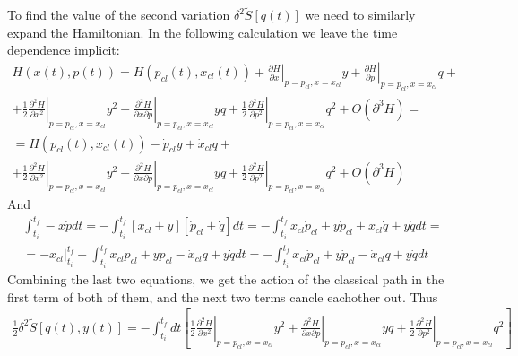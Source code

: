 \documentclass{article}
\begin{document}
To find the value of the second variation $\delta^2\tilde{S}[q(t)]$ we need to similarly expand the Hamiltonian. In the following calculation we leave the time dependence implicit:
\begin{equation}
\begin{gathered}
    H(x(t),p(t)) = H(p_{cl}(t), x_{cl}(t)) +
        \left.\frac{\partial H}{\partial x}\right|_{p=p_{cl}, x=x_{cl}}y + \left.\frac{\partial H}{\partial p}\right|_{p=p_{cl}, x=x_{cl}}q +
        \\
        +  \left.\frac{1}{2}\frac{\partial^2 H}{\partial x^2}\right|_{p=p_{cl}, x=x_{cl}}y^2
        +  \left.\frac{\partial^2 H}{\partial x\partial p}\right|_{p=p_{cl}, x=x_{cl}}yq
        +  \left.\frac{1}{2}\frac{\partial^2 H}{\partial p^2}\right|_{p=p_{cl}, x=x_{cl}}q^2 + O(\partial^3 H) = 
        \\
        = H(p_{cl}(t), x_{cl}(t)) -
        \dot{p}_{cl}y + \dot{x}_{cl}q +
        \\
        +  \left.\frac{1}{2}\frac{\partial^2 H}{\partial x^2}\right|_{p=p_{cl}, x=x_{cl}}y^2
        +  \left.\frac{\partial^2 H}{\partial x\partial p}\right|_{p=p_{cl}, x=x_{cl}}yq
        +  \left.\frac{1}{2}\frac{\partial^2 H}{\partial p^2}\right|_{p=p_{cl}, x=x_{cl}}q^2 + O(\partial^3 H)
\end{gathered}
\end{equation}
And
\begin{equation}
\begin{gathered}
    \int_{t_i}^{t_f} -x\dot{p} dt = -\int_{t_i}^{t_f} \left[x_{cl} + y\right]\left[\dot{p}_{cl} + \dot{q}\right] dt
    = -\int_{t_i}^{t_f} x_{cl}\dot{p}_{cl} + y\dot{p}_{cl} + x_{cl}\dot{q} + y\dot{q} dt =
    \\
    = -\left.x_{cl}\right|_{t_i}^{t_f}-\int_{t_i}^{t_f} x_{cl}\dot{p}_{cl} + y\dot{p}_{cl} - \dot{x}_{cl}q + y\dot{q} dt
    = -\int_{t_i}^{t_f} x_{cl}\dot{p}_{cl} + y\dot{p}_{cl} - \dot{x}_{cl}q + y\dot{q} dt
\end{gathered}
\end{equation}
Combining the last two equations, we get the action of the classical path in the first term of both of them, and the next two terms cancle eachother out. Thus
\begin{equation}
\begin{gathered}
    \frac{1}{2}\delta^2\tilde{S}[q(t), y(t)] = - \int_{t_i}^{t_f} dt \left[\left.\frac{1}{2}\frac{\partial^2 H}{\partial x^2}\right|_{p=p_{cl}, x=x_{cl}}y^2
        +  \left.\frac{\partial^2 H}{\partial x\partial p}\right|_{p=p_{cl}, x=x_{cl}}yq
        +  \left.\frac{1}{2}\frac{\partial^2 H}{\partial p^2}\right|_{p=p_{cl}, x=x_{cl}}q^2\right]
\end{gathered}
\end{equation}
\end{document}
